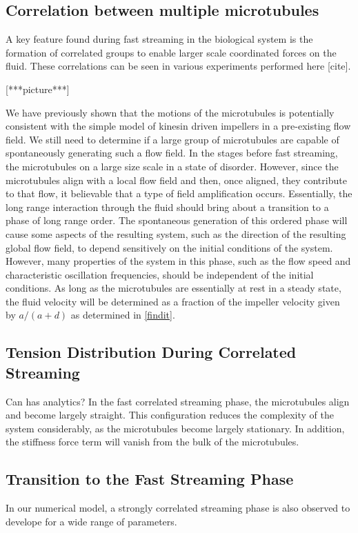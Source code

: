 \documentclass[11pt]{ucthesis}
\begin{document}
\subsection{Correlation between multiple microtubules}
A key feature found during fast streaming in the biological system is the formation of correlated groups to enable larger scale coordinated forces on the fluid. 
These correlations can be seen in various experiments performed here [cite].

[***picture***]

We have previously shown that the motions of the microtubules is potentially consistent with the simple model of kinesin driven impellers in a pre-existing flow field. 
We still need to determine if a large group of microtubules are capable of spontaneously generating such a flow field.
In the stages before fast streaming, the microtubules on a large size scale in a state of disorder.
However, since the microtubules align with a local flow field and then, once aligned, they contribute to that flow, it believable that a type of field amplification occurs.
Essentially, the long range interaction through the fluid should bring about a transition to a phase of long range order.
The spontaneous generation of this ordered phase will cause some aspects of the resulting system, such as the direction of the resulting global flow field, to depend sensitively on the initial conditions of the system.
However, many properties of the system in this phase, such as the flow speed and characteristic oscillation frequencies, should be independent of the initial conditions.
As long as the microtubules are essentially at rest in a steady state, the fluid velocity will be determined as a fraction of the impeller velocity given by $a/(a+d)$ as determined in \ref{findit}.

\subsection{Tension Distribution During Correlated Streaming}
Can has analytics?
In the fast correlated streaming phase, the microtubules align and become largely straight.
This configuration reduces the complexity of the system considerably, as the microtubules become largely stationary.
In addition, the stiffness force term will vanish from the bulk of the microtubules.

\subsection{Transition to the Fast Streaming Phase}
In our numerical model, a strongly correlated streaming phase is also observed to develope for a wide range of parameters.
\end{document}
